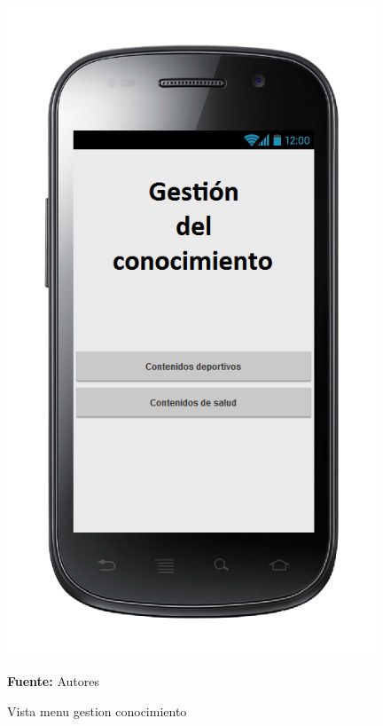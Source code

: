 \begin{figure}[!htb]
  \begin{center}
\includegraphics[width=11cm]{./imagenes/UI/Contenidos/menu_gestion_conocimiento.png}
    \caption{Vista menu gestion conocimiento}
    \label{fig:Vista_menu_gestion_conocimiento}
    \textbf{Fuente:}  Autores
  \end{center}
\end{figure}
